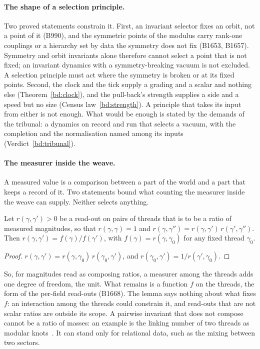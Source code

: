 \paragraph{The shape of a selection principle.}
Two proved statements constrain it. First, an invariant selector fixes an orbit, not a point of it (B990), and the
symmetric points of the modulus carry rank-one couplings or a hierarchy set by data the symmetry does not fix (B1653,
B1657). Symmetry and orbit invariants alone therefore cannot select a point that is not fixed; an invariant dynamics with a
symmetry-breaking vacuum is not excluded. A selection principle must act where the symmetry is broken or at
its fixed points. Second, the clock and the tick supply a grading and a scalar and nothing else (Theorem~\ref{bd:clock}),
and the pull-back's strength supplies a side and a speed but no size (Census law~\ref{bd:strength}). A principle that
takes its input from either is not enough. What would be enough is stated by the demands of the tribunal: a dynamics on
record and run that selects a vacuum, with the completion and the normalisation named among its inputs
(Verdict~\ref{bd:tribunal}).

\paragraph{The measurer inside the weave.}
A measured value is a comparison between a part of the world and a part that keeps a record of it. Two statements bound
what counting the measurer inside the weave can supply. Neither selects anything.

\begin{lemma}[composition]\label{lem:composition}
Let $r(\gamma,\gamma')>0$ be a read-out on pairs of threads that is to be a ratio of measured magnitudes, so that
$r(\gamma,\gamma)=1$ and $r(\gamma,\gamma'')=r(\gamma,\gamma')\,r(\gamma',\gamma'')$. Then
$r(\gamma,\gamma')=f(\gamma)/f(\gamma')$, with $f(\gamma)=r(\gamma,\gamma_0)$ for any fixed thread $\gamma_0$.
\end{lemma}
\begin{proof}
$r(\gamma,\gamma')=r(\gamma,\gamma_0)\,r(\gamma_0,\gamma')$, and $r(\gamma_0,\gamma')=1/r(\gamma',\gamma_0)$.
\end{proof}
\noindent So, for magnitudes read as composing ratios, a measurer among the threads adds one degree of freedom, the unit.
What remains is a function $f$ on the threads, the form of the per-field read-outs (B1668). The lemma says nothing about
what fixes $f$: an interaction among the threads could constrain it, and read-outs that are not scalar ratios are
outside its scope. A pairwise invariant that does not
compose cannot be a ratio of masses: an example is the linking number of two threads as modular
knots~\cite{Ghys2007,DukeImamogluToth2017}. It can stand only for relational data, such as the mixing between two sectors.

